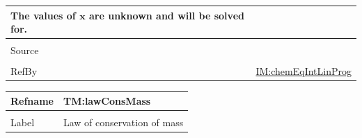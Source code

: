 \documentclass[12pt]{article}
\begin{document}
\begin{minipage}{\textwidth}
\begin{tabular}{>{\raggedright}p{}>{\raggedright\arraybackslash}p{}}
        The values of $\symbf{x}$ are unknown and will be solved for.
        
\\ \midrule \\
Source & \cite{ilpWiki}
         
\\ \midrule \\
RefBy & \hyperref[IM:chemEqIntLinProg]{IM:chemEqIntLinProg}
        
\\ \bottomrule
\end{tabular}
\end{minipage}
\vspace{\baselineskip}
\noindent
\begin{minipage}{\textwidth}
\begin{tabular}{>{\raggedright}p{}>{\raggedright\arraybackslash}p{}}
\toprule \textbf{Refname} & \textbf{TM:lawConsMass}
\label{TM:lawConsMass}
\\ \midrule \\
Label & Law of conservation of mass
        

\end{tabular}
\end{minipage}
\end{document}
